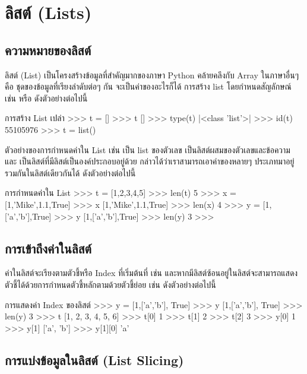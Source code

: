 \chapter{ลิสต์ (Lists)}
\section{ความหมายของลิสต์}

ลิสต์ (List) เป็นโครงสร้างข้อมูลที่สำคัญมากของภาษา Python คล้ายคลึงกับ Array ในภาษาอื่นๆ คือ ชุดของข้อมูลที่เรียงลำดับต่อๆ กัน จะเป็นค่าของอะไรก็ได้ การสร้าง list โดยกำหนดสัญลักษณ์  \pyinline{[]} เช่น   หรือ   ดังตัวอย่างต่อไปนี้

\begin{codelist}{การสร้าง List เปล่า}{}
>>> t = []
>>> t
[]
>>> type(t)
|<class \rq{}list\rq{}>|
>>> id(t)
55105976
>>> t = list()
\end{codelist}


ตัวอย่างของการกำหนดค่าใน List เช่น   เป็น list ของตัวเลข   เป็นลิสต์ผสมของตัวเลขและข้อความ และ   เป็นลิสต์ที่มีลิสต์เป็นองค์ประกอบอยู่ด้วย กล่าวได้ว่าเราสามารถเอาค่าของหลายๆ ประเภทมาอยู่รวมกันในลิสต์เดียวกันได้ ดังตัวอย่างต่อไปนี้

\begin{codelist}{การกำหนดค่าใน List}{}
>>> t = [1,2,3,4,5]
>>> len(t)
5
>>> x = [1,'Mike',1.1,True]
>>> x
[1,'Mike',1.1,True]
>>> len(x)
4
>>> y = [1,['a','b'],True]
>>> y
[1,['a','b'],True]
>>> len(y)
3
>>>
\end{codelist}


\section{การเข้าถึงค่าในลิสต์}

ค่าในลิสต์จะเรียงตามตัวชี้หรือ Index ที่เริ่มต้นที่   เช่น  และหากมีลิสต์ซ้อนอยู่ในลิสต์จะสามารถแสดงตัวชี้ได้ด้วยการกำหนดตัวชี้หลักตามด้วยตัวชี้ย่อย เช่น  ดังตัวอย่างต่อไปนี้

\begin{codelist}{การแสดงค่า Index ของลิสต์}{}
>>> y = [1,['a','b'], True]
>>> y
[1,['a','b'], True]
>>> len(y)
3
>>> t
[1, 2, 3, 4, 5, 6]
>>> t[0]
1
>>> t[1]
2
>>> t[2]
3
>>> y[0]
1
>>> y[1]
['a', 'b']
>>> y[1][0]
'a'
\end{codelist}


\section{การแบ่งข้อมูลในลิสต์ (List Slicing)}


